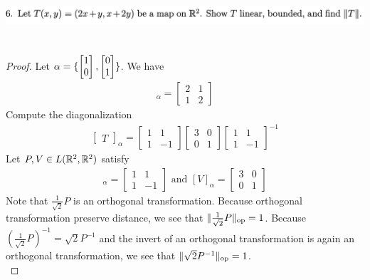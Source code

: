\documentclass{report}
\begin{document}
\begin{question}{}{}
\includegraphics[height=2cm,width=18cm]{ahw4q6}
\end{question}
\begin{proof}
Let $\alpha =\{ \begin{bmatrix}
1\\
0
\end{bmatrix},\begin{bmatrix}
0\\
1
\end{bmatrix} \}$. We have
\begin{align*}
[T]_\alpha = \begin{bmatrix}
  2&1\\
  1 & 2
\end{bmatrix}
\end{align*}
Compute the diagonalization 
\begin{align*}
\begin{bmatrix}
T
\end{bmatrix}_{\alpha }= \begin{bmatrix}
1 & 1 \\
1 & -1
\end{bmatrix}\begin{bmatrix}
3 & 0 \\
0 & 1
\end{bmatrix}\begin{bmatrix}
1 & 1 \\
1 & -1
\end{bmatrix}^{-1}
\end{align*}
Let $P,V\in L(\mathbb{R}^2,\mathbb{R}^2)$ satisfy 
\begin{align*}
  [P]_\alpha = \begin{bmatrix}
    1 & 1 \\
    1 & -1
  \end{bmatrix}\text{ and }[V]_\alpha = \begin{bmatrix}
    3 & 0 \\
    0 & 1
  \end{bmatrix}
\end{align*}
Note that $\frac{1}{\sqrt{2}}P$ is an orthogonal transformation. Because orthogonal transformation preserve distance, we see that $\| \frac{1}{\sqrt{2}}P \|_\text{op}=1$. Because $(\frac{1}{\sqrt{2}}P)^{-1}=\sqrt{2}P^{-1}$ and the invert of an orthogonal transformation is again an orthogonal transformation, we see that $\| \sqrt{2}P^{-1} \|_\text{op}=1$.\\



\end{proof}
\end{document}
